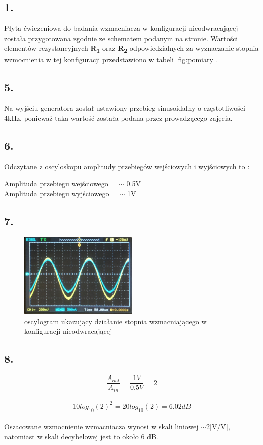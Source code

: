 \documentclass[polish,a4paper]{article}
\begin{document}
\subsection*{1.}
Płyta ćwiczeniowa do badania wzmacniacza w konfiguracji nieodwracającej została przygotowana zgodnie ze schematem podanym na stronie\cite{rlc}.  Wartości elementów rezystancyjnych \textbf{R\textsubscript{1}} oraz \textbf{R\textsubscript{2}} odpowiedzialnych za wyznaczanie stopnia wzmocnienia w tej konfiguracji przedstawiono w tabeli \ref{fig:pomiary}.
\subsection*{5.}
Na wyjściu generatora został ustawiony przebieg sinusoidalny o częstotliwości 4kHz, ponieważ taka wartość została podana przez prowadzącego zajęcia.
\subsection*{6.}
Odczytane z oscyloskopu amplitudy przebiegów wejściowych i wyjściowych to : 
\begin{center}
Amplituda przebiegu wejściowego = $\sim$ 0.5V \\
Amplituda przebiegu wyjściowego = $\sim$ 1V
\end{center}
 
\subsection*{7.}
\begin{figure}[!h]
\centering
\includegraphics[width=0.5\textwidth]{amplituda}
\caption{oscylogram ukazujący działanie stopnia wzmacniającego w konfiguracji nieodwracającej}
\end{figure}
\subsection*{8.}
$$\frac{A_{out}}{A_{in}} = \frac{1V}{0.5V} = 2$$\\
$$10 log_{10}(2)^2 = 20 log_{10}(2) = 6.02dB$$\\
Oszacowane wzmocnienie wzmacniacza wynosi w skali liniowej $\sim$2[V/V], natomiast w skali decybelowej jest to około 6 dB. \\
\end{document}
